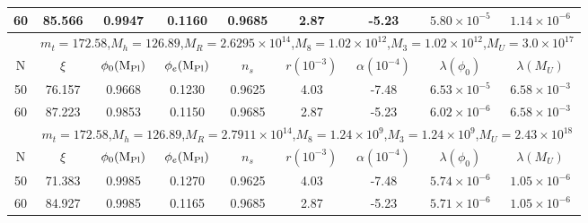 \documentclass[aps,prd,preprint,superscriptaddress,showpacs,ctexart]{revtex4-1}
\providecommand{\tabularnewline}{\\}
\begin{document}
\begin{table}[H]
\begin{tabular}{|c|c|c|c|c|c|c|c|c|}
\hline
{\footnotesize{}{}{}60}  & {\footnotesize{}{}{}85.566}  & {\footnotesize{}{}{}0.9947}  & {\footnotesize{}{}{}0.1160}  & {\footnotesize{}{}{}0.9685}  & {\footnotesize{}{}{}2.87}  & {\footnotesize{}{}{}-5.23}  & {\footnotesize{}{}{}$5.80\times10^{-5}$}  & {\footnotesize{}{}{}$1.14\times10^{-6}$ }\tabularnewline
\hline
\hline
 & \multicolumn{8}{c|}{{\footnotesize{}{}{}$m_{t}=172.58$,$M_{h}=126.89$,$M_{R}=2.6295\times10^{14}$,$M_{8}=1.02\times10^{12}$,$M_{3}=1.02\times10^{12}$,$M_{U}=3.0\times10^{17}$}}\tabularnewline
\hline
{\footnotesize{}{}{}N}  & {\footnotesize{}{}{}$\xi$ }  & {\footnotesize{}{}{}$\phi_{0}({\rm M_{Pl})}$}  & {\footnotesize{}{}{}$\phi_{e}({\rm M_{Pl})}$}  & {\footnotesize{}{}{}$n_{s}$}  & {\footnotesize{}{}{}$r(10^{-3})$}  & {\footnotesize{}{}{}$\alpha(10^{-4})$}  & {\footnotesize{}{}{}$\lambda(\phi_{0})$}  & {\footnotesize{}{}{}$\lambda(M_{U})$}\tabularnewline
\hline
{\footnotesize{}{}{}50}  & {\footnotesize{}{}{}76.157}  & {\footnotesize{}{}{}0.9668}  & {\footnotesize{}{}{}0.1230}  & {\footnotesize{}{}{}0.9625}  & {\footnotesize{}{}{}4.03}  & {\footnotesize{}{}{}-7.48 }  & {\footnotesize{}{}{}$6.53\times10^{-5}$}  & {\footnotesize{}{}{}$6.58\times10^{-3}$}\tabularnewline
\hline
{\footnotesize{}{}{}60}  & {\footnotesize{}{}{}87.223}  & {\footnotesize{}{}{}0.9853}  & {\footnotesize{}{}{}0.1150}  & {\footnotesize{}{}{}0.9685}  & {\footnotesize{}{}{}2.87}  & {\footnotesize{}{}{}-5.23}  & {\footnotesize{}{}{}$6.02\times10^{-6}$}  & {\footnotesize{}{}{}$6.58\times10^{-3}$ }\tabularnewline
\hline
 & \multicolumn{8}{c|}{{\footnotesize{}{}{}$m_{t}=172.58$,$M_{h}=126.89$,$M_{R}=2.7911\times10^{14}$,$M_{8}=1.24\times10^{9}$,$M_{3}=1.24\times10^{9}$,$M_{U}=2.43\times10^{18}$}}\tabularnewline
\hline
{\footnotesize{}{}{}N}  & {\footnotesize{}{}{}$\xi$ }  & {\footnotesize{}{}{}$\phi_{0}({\rm M_{Pl})}$}  & {\footnotesize{}{}{}$\phi_{e}({\rm M_{Pl})}$}  & {\footnotesize{}{}{}$n_{s}$}  & {\footnotesize{}{}{}$r(10^{-3})$}  & {\footnotesize{}{}{}$\alpha(10^{-4})$}  & {\footnotesize{}{}{}$\lambda(\phi_{0})$}  & {\footnotesize{}{}{}$\lambda(M_{U})$}\tabularnewline
\hline
{\footnotesize{}{}{}50}  & {\footnotesize{}{}{}71.383}  & {\footnotesize{}{}{}0.9985}  & {\footnotesize{}{}{}0.1270}  & {\footnotesize{}{}{}0.9625}  & {\footnotesize{}{}{}4.03}  & {\footnotesize{}{}{}-7.48 }  & {\footnotesize{}{}{}$5.74\times10^{-6}$}  & {\footnotesize{}{}{}$1.05\times10^{-6}$}\tabularnewline
\hline
{\footnotesize{}{}{}60}  & {\footnotesize{}{}{}84.927}  & {\footnotesize{}{}{}0.9985}  & {\footnotesize{}{}{}0.1165}  & {\footnotesize{}{}{}0.9685}  & {\footnotesize{}{}{}2.87}  & {\footnotesize{}{}{}-5.23}  & {\footnotesize{}{}{}$5.71\times10^{-6}$}  & {\footnotesize{}{}{}$1.05\times10^{-6}$ }\tabularnewline

\end{tabular}
\end{table}
\end{document}
